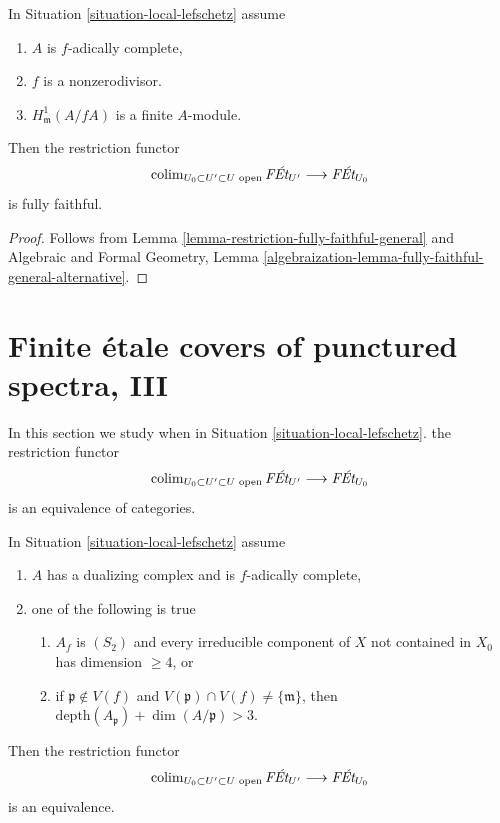 \begin{lemma}
\label{lemma-fully-faithful-general}
In Situation \ref{situation-local-lefschetz} assume
\begin{enumerate}
\item $A$ is $f$-adically complete,
\item $f$ is a nonzerodivisor.
\item $H^1_\mathfrak m(A/fA)$ is a finite $A$-module.
\end{enumerate}
Then the restriction functor
$$
\mathop{\mathrm{colim}}\nolimits_{U_0 \subset U' \subset U\text{ open}} \textit{F\'Et}_{U'}
\longrightarrow
\textit{F\'Et}_{U_0}
$$
is fully faithful.
\end{lemma}

\begin{proof}
Follows from
Lemma \ref{lemma-restriction-fully-faithful-general} and
Algebraic and Formal Geometry, Lemma
\ref{algebraization-lemma-fully-faithful-general-alternative}.
\end{proof}








\section{Finite \'etale covers of punctured spectra, III}
\label{section-pi1-punctured-spec-III}

\noindent
In this section we study when in Situation \ref{situation-local-lefschetz}.
the restriction functor
$$
\mathop{\mathrm{colim}}\nolimits_{U_0 \subset U' \subset U\text{ open}} \textit{F\'Et}_{U'}
\longrightarrow
\textit{F\'Et}_{U_0}
$$
is an equivalence of categories.

\begin{lemma}
\label{lemma-essentially-surjective-general-better}
In Situation \ref{situation-local-lefschetz} assume
\begin{enumerate}
\item $A$ has a dualizing complex and is $f$-adically complete,
\item one of the following is true
\begin{enumerate}
\item $A_f$ is $(S_2)$ and every irreducible component of $X$
not contained in $X_0$ has dimension $\geq 4$, or
\item if $\mathfrak p \not \in V(f)$ and
$V(\mathfrak p) \cap V(f) \not = \{\mathfrak m\}$, then
$\text{depth}(A_\mathfrak p) + \dim(A/\mathfrak p) > 3$.
\end{enumerate}
\end{enumerate}
Then the restriction functor
$$
\mathop{\mathrm{colim}}\nolimits_{U_0 \subset U' \subset U\text{ open}} \textit{F\'Et}_{U'}
\longrightarrow
\textit{F\'Et}_{U_0}
$$
is an equivalence.
\end{lemma}

